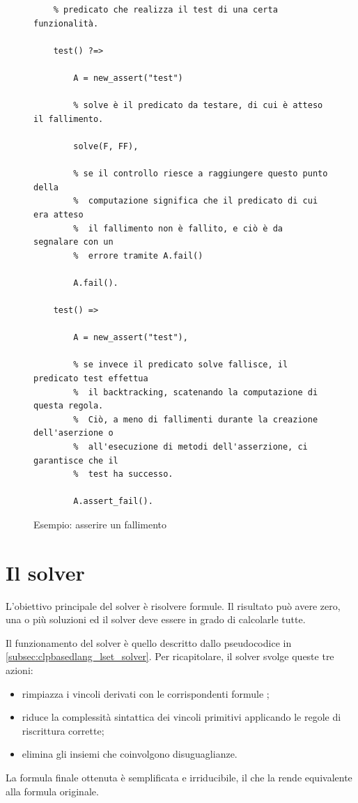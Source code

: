\documentclass[12pt,a4paper,openright]{book}  %
\begin{document}
\begin{figure}
	\begin{verbatim}
	% predicato che realizza il test di una certa funzionalità.

	test() ?=>

	    A = new_assert("test")

	    % solve è il predicato da testare, di cui è atteso il fallimento.

	    solve(F, FF),

	    % se il controllo riesce a raggiungere questo punto della
	    %  computazione significa che il predicato di cui era atteso
	    %  il fallimento non è fallito, e ciò è da segnalare con un
	    %  errore tramite A.fail()

	    A.fail().

	test() =>

	    A = new_assert("test"),

	    % se invece il predicato solve fallisce, il predicato test effettua
	    %  il backtracking, scatenando la computazione di questa regola.
	    %  Ciò, a meno di fallimenti durante la creazione dell'aserzione o
	    %  all'esecuzione di metodi dell'asserzione, ci garantisce che il
	    %  test ha successo.

	    A.assert_fail().
	\end{verbatim}
 	\caption{Esempio: asserire un fallimento}
	\label{fig:example_unittest_assertfail}
\end{figure}

\section{Il solver}
\label{sec:lsetpicat_solver}

L'obiettivo principale del solver \lset{} è risolvere formule. Il
risultato può avere zero, una o più soluzioni ed il solver deve essere
in grado di calcolarle tutte.

Il funzionamento del solver è quello descritto dallo pseudocodice in
\ref{subsec:clpbasedlang_lset_solver}. Per ricapitolare, il solver
svolge queste tre azioni:
\begin{itemize}
	\item rimpiazza i vincoli derivati con le corrispondenti
          formule \lset{};
	\item riduce la complessità sintattica dei vincoli primitivi
          applicando le regole di riscrittura corrette;
	\item elimina gli insiemi che coinvolgono disuguaglianze.
\end{itemize}
La formula finale ottenuta è semplificata e irriducibile, il che la
rende equivalente alla formula originale.
\end{document}
